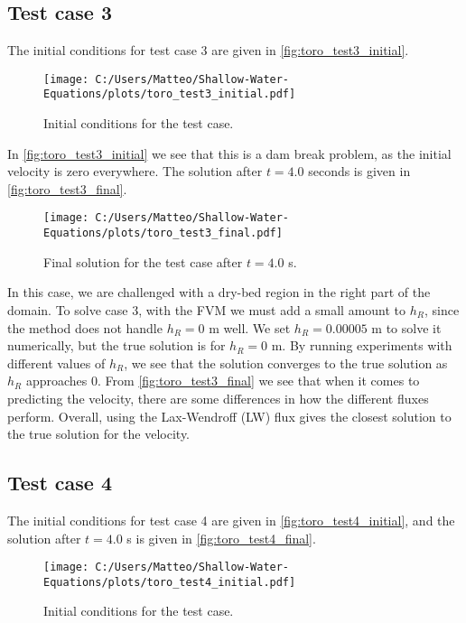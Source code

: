 \newpage
\subsection*{Test case 3}
The initial conditions for test case 3 are given in \autoref{fig:toro_test3_initial}.
\begin{figure}[H]
    \centering
    \texttt{[image: C:/Users/Matteo/Shallow-Water-Equations/plots/toro\_test3\_initial.pdf]}
    \caption{Initial conditions for the test case.}\label{fig:toro_test3_initial}
\end{figure}
In \autoref{fig:toro_test3_initial} we see that this is a dam break problem, as the initial velocity is zero everywhere.
The solution after $t=4.0$ seconds is given in \autoref{fig:toro_test3_final}.
\begin{figure}[H]
    \centering
    \texttt{[image: C:/Users/Matteo/Shallow-Water-Equations/plots/toro\_test3\_final.pdf]}
    \caption{Final solution for the test case after $t = 4.0$ s.}\label{fig:toro_test3_final}
\end{figure}
In this case, we are challenged with a dry-bed region in the right part of the domain.
To solve case 3, with the FVM we must add a small amount to $h_R$, since the method does not handle $h_R = 0$ m well.
We set $h_R = 0.00005$ m to solve it numerically, but the true solution is for $h_R = 0$ m.
By running experiments with different values of $h_R$, we see that the solution converges to the true solution as $h_R$ approaches 0.
From \autoref{fig:toro_test3_final} we see that when it comes to predicting the velocity, there are some differences in how the different fluxes perform.
Overall, using the Lax-Wendroff (LW) flux gives the closest solution to the true solution for the velocity.

\newpage
\subsection*{Test case 4}
The initial conditions for test case 4 are given in \autoref{fig:toro_test4_initial}, and the solution after $t=4.0$ s is given in \autoref{fig:toro_test4_final}.
\begin{figure}[H]
    \centering
    \texttt{[image: C:/Users/Matteo/Shallow-Water-Equations/plots/toro\_test4\_initial.pdf]}
    \caption{Initial conditions for the test case.}\label{fig:toro_test4_initial}
\end{figure}


